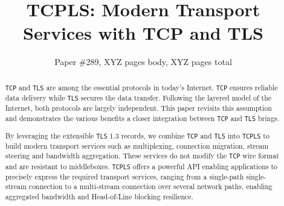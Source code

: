 \documentclass[10pt,sigconf,letterpaper,anonymous,nonacm]{acmart}
\newcommand{\tcpls}{\texttt{TCPLS}\xspace}
\newcommand{\tcp}{\texttt{TCP}\xspace}
\newcommand{\mptcp}{\texttt{MPTCP}\xspace}
\newcommand{\tls}{\texttt{TLS}\xspace}
\newcommand{\quic}{\texttt{QUIC}\xspace}
\begin{document}
\title{TCPLS: Modern Transport Services with TCP and TLS}

\author{Paper \#289, XYZ pages body, XYZ pages total}

\renewcommand{\shortauthors}{X.et al.}


\begin{abstract}
  \tcp and \tls are among the essential protocols in today's Internet. \tcp
  ensures reliable data delivery while \tls secures the data transfer.
  Following the layered model of the Internet, %
  both protocols are largely independent.
  This paper revisits this
  assumption and demonstrates the various benefits a closer integration between
  \tcp and \tls brings.
  
  By leveraging the extensible \tls 1.3 records, we combine \tcp and \tls into 
  \tcpls to 
  build modern transport services such as multiplexing, connection migration, 
  stream steering and bandwidth aggregation. These services do not modify the 
  \tcp wire 
  format and are resistant 
  to middleboxes. \tcpls offers a powerful API enabling applications to 
  precisely express the required transport services, ranging from a single-path 
  single-stream connection to a multi-stream connection over several network 
  paths, enabling aggregated bandwidth and Head-of-Line blocking resilience.



\end{abstract}
\end{document}
